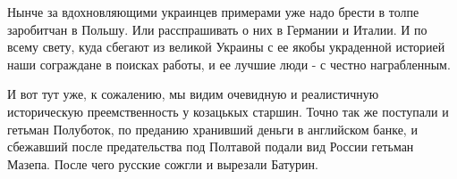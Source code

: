 Нынче за вдохновляющими украинцев примерами уже надо брести в толпе заробитчан
в Польшу. Или расспрашивать о них в Германии и Италии. И по всему свету, куда
сбегают из великой Украины с ее якобы украденной историей наши сограждане в
поисках работы, и ее лучшие люди - с честно награбленным.

И вот тут уже, к сожалению, мы видим очевидную и реалистичную историческую
преемственность у козацькых старшин. Точно так же поступали и гетьман
Полуботок, по преданию хранивший деньги в английском банке, и сбежавший после
предательства под Полтавой подали вид России гетьман Мазепа. После чего русские
сожгли и вырезали Батурин.

